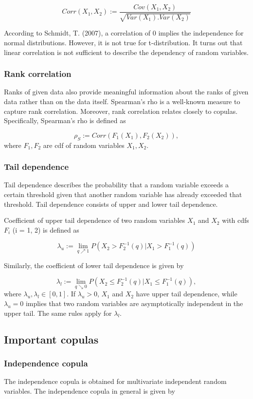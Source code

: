 \documentclass[12pt,a4paper]{article}
\numberwithin{equation}{section}
\begin{document}
 \[Corr(X_1, X_2) := \frac{Cov(X_1, X_2)}{\sqrt{Var(X_1).Var(X_2)}}\]
 
 According to Schmidt, T. (2007), a correlation of 0 implies the independence for normal distributions. However, it is not true for t-distribution. It turns out that linear correlation is not sufficient to describe the dependency of random variables.
 
 \subsubsection{Rank correlation}
 Ranks of given data also provide meaningful information about the ranks of given data rather than on the data itself. Spearman's rho is a well-known measure to capture rank correlation. Moreover, rank correlation relates closely to copulas. Specifically, Spearman's rho is defined as
 
 \[\rho_S := Corr(F_1(X_1), F_2(X_2)),\]
 where $F_1, F_2$ are cdf of random variables $X_1, X_2$.
 \subsubsection{Tail dependence}
 Tail dependence describes the probability that a random variable exceeds a certain threshold given that another random variable has already exceeded that threshold. Tail dependence consists of upper and lower tail dependence. 
 
 Coefficient of upper tail dependence of two random variables $X_1$ and $X_2$ with cdfs $F_i$ (i = 1, 2) is defined as
 
 \[\lambda_u := \lim_{q \nearrow 1} P(X_2 > F_2^{-1}(q)|X_1 > F_1^{-1}(q))\]
 
 Similarly, the coefficient of lower tail dependence is given by
 
  \[\lambda_l := \lim_{q \searrow 0} P(X_2 \leq F_2^{-1}(q)|X_1 \leq F_1^{-1}(q)),\]
 where $\lambda_u, \lambda_l \in [0,1]$. If $\lambda_u > 0$, $X_1$ and $X_2$ have upper tail dependence, while $\lambda_u = 0$ implies that two random variables are asymptotically independent in the upper tail. The same rules apply for $\lambda_l$.
  
 \subsection{Important copulas}
 \subsubsection{Independence copula}
 The independence copula is obtained for multivariate independent random variables. The independence copula in general is given by
 
\end{document}
